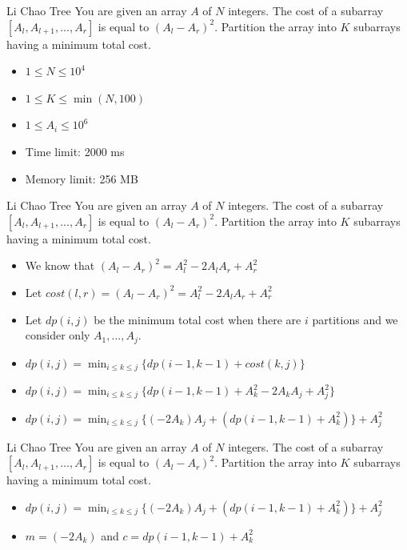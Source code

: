 \documentclass[aspectratio=169,xcolor=dvipsnames]{beamer}
\begin{document}
\newcommand{\probstatement}{You are given an array $A$ of $N$ integers. The cost of a subarray $[A_l, A_{l+1}, ..., A_r]$ is equal to $(A_l - A_r)^2$. Partition the array into $K$ subarrays having a minimum total cost.}

\begin{frame}{Li Chao Tree}
\probstatement
\begin{itemize}
    \item $1 \leq N \leq 10^4$
    \item $1 \leq K \leq \min(N, 100)$
    \item $1 \leq A_i \leq 10^6$
    \item Time limit: 2000 ms
    \item Memory limit: 256 MB
\end{itemize}
\end{frame}

\begin{frame}{Li Chao Tree}
\probstatement
\begin{itemize}
    \item We know that $(A_l - A_r)^2 = A_l^2 - 2A_lA_r + A_r^2$
    \pause
    \item Let $cost(l, r) = (A_l - A_r)^2 = A_l^2 - 2A_lA_r + A_r^2$
    \pause
    \item Let $dp(i, j)$ be the minimum total cost when there are $i$ partitions and we consider only $A_1, ..., A_j$.
    \pause
    \item $dp(i, j) = \displaystyle\min_{i\leq k\leq j}\{dp(i-1, k-1) + cost(k, j)\}$
    \pause
    \item $dp(i, j) = \displaystyle\min_{i\leq k\leq j}\{dp(i-1, k-1) + A_k^2 - 2A_kA_j + A_j^2\}$
    \pause
    \item $dp(i, j) = \displaystyle\min_{i\leq k\leq j}\{(-2A_k)A_j + (dp(i-1, k-1) + A_k^2)\} + A_j^2$
\end{itemize}
\end{frame}

\begin{frame}{Li Chao Tree}
\probstatement
\begin{itemize}
    \item $dp(i, j) = \displaystyle\min_{i\leq k\leq j}\{(-2A_k)A_j + (dp(i-1, k-1) + A_k^2)\} + A_j^2$
    \pause
    \item $m = (-2A_k)$ and $c = dp(i-1, k-1) + A_k^2$
\end{itemize}
\end{frame}
\end{document}
